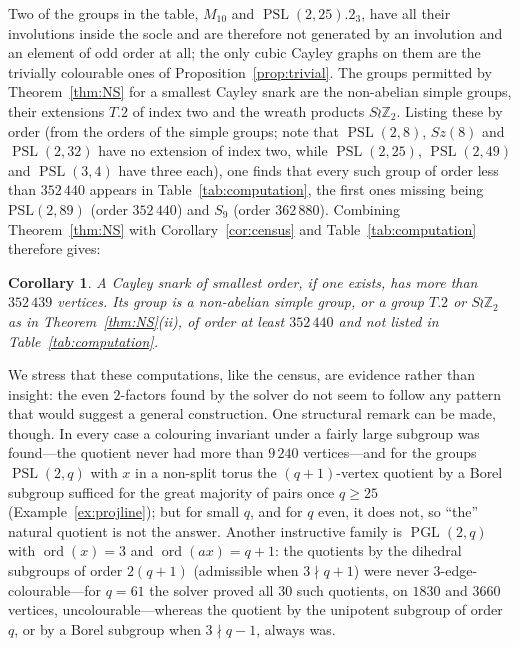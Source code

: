 \documentclass[11pt,a4paper]{article}
\newtheorem{corollary}[theorem]{Corollary}
\theoremstyle{definition}
\theoremstyle{remark}
\newcommand{\ord}{\operatorname{ord}}
\newcommand{\PSL}{\operatorname{PSL}}
\newcommand{\PGL}{\operatorname{PGL}}
\newcommand{\ZZ}{\mathbb{Z}}
\begin{document}
Two of the groups in the table, $M_{10}$ and $\PSL(2,25).2_3$, have all their involutions inside the socle and are therefore not generated by an involution and an element of odd order at all; the only cubic Cayley graphs on them are the trivially colourable ones of Proposition~\ref{prop:trivial}.  The groups permitted by Theorem~\ref{thm:NS} for a smallest Cayley snark are the non-abelian simple groups, their extensions $T.2$ of index two and the wreath products $S\wr\ZZ_2$.  Listing these by order (from the orders of the simple groups; note that $\PSL(2,8)$, $Sz(8)$ and $\PSL(2,32)$ have no extension of index two, while $\PSL(2,25)$, $\PSL(2,49)$ and $\PSL(3,4)$ have three each), one finds that every such group of order less than $352\,440$ appears in Table~\ref{tab:computation}, the first ones missing being $\mathrm{PSL}(2,89)$ (order $352\,440$) and $S_9$ (order $362\,880$).  Combining Theorem~\ref{thm:NS} with Corollary~\ref{cor:census} and Table~\ref{tab:computation} therefore gives:

\begin{corollary}\label{cor:bound}
A Cayley snark of smallest order, if one exists, has more than $352\,439$ vertices.  Its group is a non-abelian simple group, or a group $T.2$ or $S\wr\ZZ_2$ as in Theorem~\ref{thm:NS}\textup{(ii)}, of order at least $352\,440$ and not listed in Table~\ref{tab:computation}.
\end{corollary}

We stress that these computations, like the census, are evidence rather than insight: the even $2$-factors found by the solver do not seem to follow any pattern that would suggest a general construction.  One structural remark can be made, though.  In every case a colouring invariant under a fairly large subgroup was found---the quotient never had more than $9\,240$ vertices---and for the groups $\PSL(2,q)$ with $x$ in a non-split torus the $(q+1)$-vertex quotient by a Borel subgroup sufficed for the great majority of pairs once $q\ge 25$ (Example~\ref{ex:projline}); but for small $q$, and for $q$ even, it does not, so ``the'' natural quotient is not the answer.  Another instructive family is $\PGL(2,q)$ with $\ord(x)=3$ and $\ord(ax)=q+1$: the quotients by the dihedral subgroups of order $2(q+1)$ (admissible when $3\nmid q+1$) were never $3$-edge-colourable---for $q=61$ the solver proved all $30$ such quotients, on $1830$ and $3660$ vertices, uncolourable---whereas the quotient by the unipotent subgroup of order $q$, or by a Borel subgroup when $3\nmid q-1$, always was.
\end{document}
